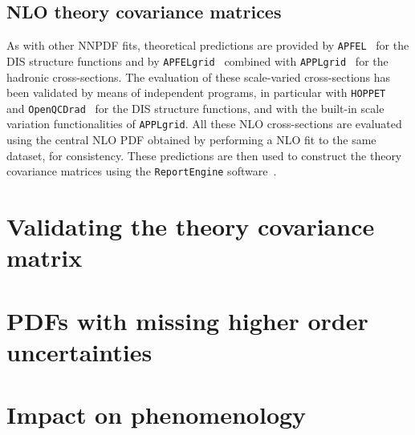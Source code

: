 \subsection{NLO theory covariance matrices}
As with other NNPDF fits, theoretical predictions are provided 
by {\tt APFEL}~\cite{Bertone:2013vaa} for the DIS structure functions
and by {\tt APFELgrid}~\cite{Bertone:2016lga} combined with
{\tt APPLgrid}~\cite{Carli:2010rw} for the hadronic
cross-sections.
%
The evaluation of these scale-varied cross-sections has been validated
by means of independent programs, in particular with {\tt HOPPET}~\cite{Salam:2008qg}
and {\tt OpenQCDrad}~\cite{Alekhin:2012ig}
for the DIS structure functions, and with the built-in scale variation
functionalities of {\tt APPLgrid}. All these NLO cross-sections are evaluated using the central NLO PDF obtained by performing a NLO fit to the same dataset, for consistency. These predictions are then used to construct the theory covariance matrices using the {\tt ReportEngine} software~\cite{zahari_kassabov_2019_2571601}.



\section{Validating the theory covariance matrix}
\label{sec:valid}

\section{PDFs with missing higher order uncertainties}
\label{sec:pdfs}

\section{Impact on phenomenology}
\label{sec:mhoupheno}
